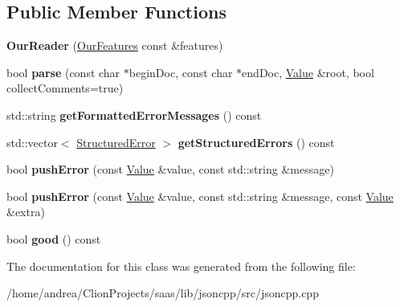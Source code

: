 \subsection*{Public Member Functions}
\begin{DoxyCompactItemize}
\item 
{\bfseries Our\+Reader} (\hyperlink{class_json_1_1_our_features}{Our\+Features} const \&features)\hypertarget{class_json_1_1_our_reader_a48a850914b9c8d7781be172930c478e5}{}\label{class_json_1_1_our_reader_a48a850914b9c8d7781be172930c478e5}

\item 
bool {\bfseries parse} (const char $\ast$begin\+Doc, const char $\ast$end\+Doc, \hyperlink{class_json_1_1_value}{Value} \&root, bool collect\+Comments=true)\hypertarget{class_json_1_1_our_reader_aba4f8749aab7f02ec17f107e392caf80}{}\label{class_json_1_1_our_reader_aba4f8749aab7f02ec17f107e392caf80}

\item 
std\+::string {\bfseries get\+Formatted\+Error\+Messages} () const \hypertarget{class_json_1_1_our_reader_ae9cbb7dbd9c6c96be37432e8dfa1afcb}{}\label{class_json_1_1_our_reader_ae9cbb7dbd9c6c96be37432e8dfa1afcb}

\item 
std\+::vector$<$ \hyperlink{struct_json_1_1_our_reader_1_1_structured_error}{Structured\+Error} $>$ {\bfseries get\+Structured\+Errors} () const \hypertarget{class_json_1_1_our_reader_a02ef7871af3706754a233c36e6d489e9}{}\label{class_json_1_1_our_reader_a02ef7871af3706754a233c36e6d489e9}

\item 
bool {\bfseries push\+Error} (const \hyperlink{class_json_1_1_value}{Value} \&value, const std\+::string \&message)\hypertarget{class_json_1_1_our_reader_aef7aa4ca22ffaa38c401b16951d20e1e}{}\label{class_json_1_1_our_reader_aef7aa4ca22ffaa38c401b16951d20e1e}

\item 
bool {\bfseries push\+Error} (const \hyperlink{class_json_1_1_value}{Value} \&value, const std\+::string \&message, const \hyperlink{class_json_1_1_value}{Value} \&extra)\hypertarget{class_json_1_1_our_reader_ad43315cbb0d6804e3b7177e84a1ec53d}{}\label{class_json_1_1_our_reader_ad43315cbb0d6804e3b7177e84a1ec53d}

\item 
bool {\bfseries good} () const \hypertarget{class_json_1_1_our_reader_a048346238d703ad9aed06beb686e6102}{}\label{class_json_1_1_our_reader_a048346238d703ad9aed06beb686e6102}

\end{DoxyCompactItemize}


The documentation for this class was generated from the following file\+:\begin{DoxyCompactItemize}
\item 
/home/andrea/\+Clion\+Projects/saas/lib/jsoncpp/src/jsoncpp.\+cpp\end{DoxyCompactItemize}
